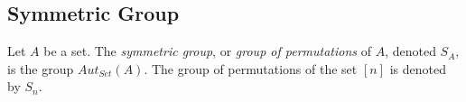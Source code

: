 \subsection{Symmetric Group}\label{symmetricgroup}
Let $A$ be a set. The \emph{symmetric group}, or \emph{group of permutations} of $A$, denoted $S_A$, is the group
$Aut_{Set}(A)$. The group of permutations of the set $[n]$ is denoted by $S_n$.